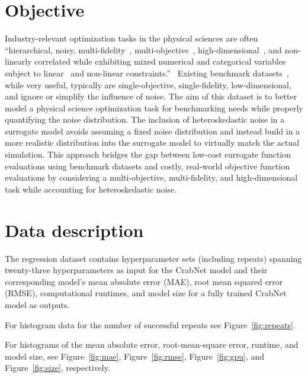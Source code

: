 \documentclass[pdflatex,sn-mathphys-num]{sn-jnl}
\begin{document}
\section{Objective}

Industry-relevant optimization tasks in the physical sciences are often ``hierarchical, noisy, multi-fidelity~\cite{Existing01_Ghoreishi2019,Existing02_Kandasamy2020_Dragonfly}, multi-objective~\cite{Existing03_Hanaoka2022,Existing04_Hase2018_Chimera}, high-dimensional~\cite{Existing05_Baird2022_CrabNet,Existing06_Eriksson2021_SAASBO}, and non-linearly correlated while exhibiting mixed numerical and categorical variables subject to linear~\cite{Existing07_09_Baird2023_Compactness} and non-linear constraints.''~\cite{Existing07_09_Baird2023_Compactness,Existing08_Baird2023_HardSphere} Existing benchmark datasets~\cite{Existing10_Dunn2020_Matbench,Existing11_DeBreuck2021_MODNet,Existing12_Wang2022_ActiveLearning,Existing13_Liang2021_BO_Benchmarks,Existing14_Henderson2021,Existing15_Hase2021_Olympus}, while very useful, typically are single-objective, single-fidelity, low-dimensional, and ignore or simplify the influence of noise. The aim of this dataset is to better model a physical science optimization task for benchmarking needs while properly quantifying the noise distribution. The inclusion of heteroskedastic noise in a surrogate model avoids assuming a fixed noise distribution and instead build in a more realistic distribution into the surrogate model to virtually match the actual simulation. This approach bridges the gap between low-cost surrogate function evaluations using benchmark datasets and costly, real-world objective function evaluations by considering a multi-objective, multi-fidelity, and high-dimensional task while accounting for heteroskedastic noise.

\section{Data description}

The regression dataset contains hyperparameter sets (including repeats) spanning twenty-three hyperparameters as input for the CrabNet model and their corresponding model's mean absolute error (MAE), root mean squared error (RMSE), computational runtimes, and model size for a fully trained CrabNet model as outputs.

For histogram data for the number of successful repeats see Figure~\ref{fig:repeats}.

For histograms of the mean absolute error, root-mean-square error, runtime, and model size, see Figure~\ref{fig:mae}, Figure~\ref{fig:rmse}, Figure~\ref{fig:gpu}, and Figure~\ref{fig:size}, respectively.
\end{document}
